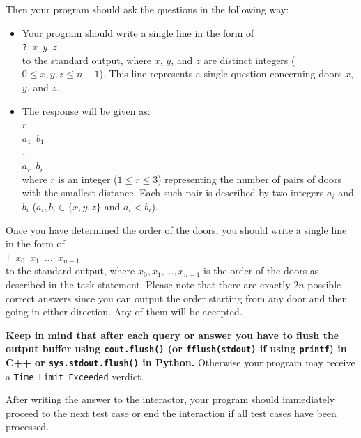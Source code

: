 Then your program should ask the questions in the following way:
\begin{itemize}
\item Your program should write a single line in the form of\vspace{3mm}\\
\texttt{? $x$ $y$ $z$} \vspace{3mm}\\
to the standard output, where $x$, $y$, and $z$ are distinct
integers ($0\leq x,y,z\leq n-1$). This line represents a single question
concerning doors $x$, $y$, and $z$.

\item The response will be given as:\vspace{3mm}\\
\texttt{$r$\\
$a_1$ $b_1$\\
$\ldots$\\
$a_r$ $b_r$}\vspace{3mm}\\
where $r$ is an integer ($1\leq r\leq 3$)  representing the number of
pairs of doors with the smallest distance.
Each such pair is described by two integers $a_{i}$ and $b_{i}$ ($a_{i}, b_{i} \in \{x,y,z \}$ and $a_{i} < b_{i}$).
\end{itemize}

\noindent Once you have determined the order of the doors, you should write a single line
in the form of\vspace{3mm} \\
\texttt{! $x_0$ $x_1$ $\ldots$ $x_{n-1}$}\vspace{3mm}\\
to the standard output, where $x_0, x_1, \ldots, x_{n-1}$ is the order of the doors
as described in the task statement.
Please note that there are exactly $2n$ possible
correct answers since you can output the order starting from any door and then going in either direction.
Any of them will be accepted.

\textbf{Keep in mind that after each query or answer you have to flush the output buffer using
\texttt{cout.flush()} (or \texttt{fflush(stdout)} if using \texttt{printf}) in C++
or \texttt{sys.stdout.flush()} in Python.} Otherwise your program may
receive a \texttt{Time Limit Exceeded} verdict.

After writing the answer to the interactor, your program should immediately proceed to the next test case
or end the interaction if all test cases have been processed.

